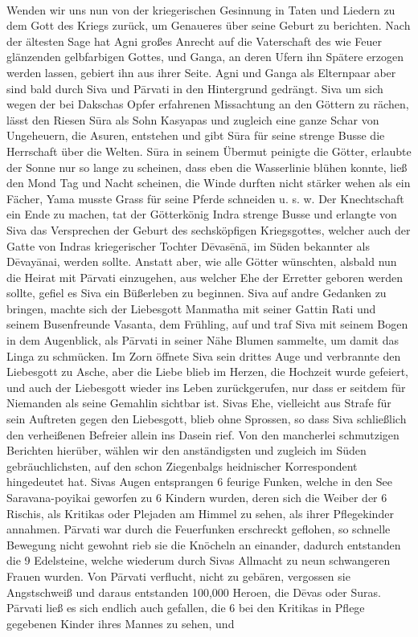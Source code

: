 \documentclass{article}
\begin{document}
\paragraph{}
Wenden wir uns nun von der kriegerischen Gesinnung in Taten und Liedern zu dem Gott des Kriegs zurück, um Genaueres über seine Geburt zu berichten. Nach der ältesten Sage hat Agni großes Anrecht auf die Vaterschaft des wie Feuer glänzenden gelbfarbigen Gottes, und Ganga, an deren Ufern ihn Spätere erzogen werden lassen, gebiert ihn aus ihrer Seite. Agni und Ganga als Elternpaar aber sind bald durch Siva und P\={a}rvati in den Hintergrund gedrängt. Siva um sich wegen der bei Dakschas Opfer erfahrenen Missachtung an den Göttern zu rächen, lässt den Riesen S\={u}ra als Sohn Kasyapas und zugleich eine ganze Schar von Ungeheuern, die Asuren, entstehen und gibt S\={u}ra für seine strenge Busse die Herrschaft über die Welten. S\={u}ra in seinem Übermut peinigte die Götter, erlaubte der Sonne nur so lange zu scheinen, dass eben die Wasserlinie blühen konnte, ließ den Mond Tag und Nacht scheinen, die Winde durften nicht stärker wehen als ein Fächer, Yama musste Grass für seine Pferde schneiden u. s. w. Der Knechtschaft ein Ende zu machen, tat der Götterkönig Indra strenge Busse und erlangte von Siva das Versprechen der Geburt des sechsköpfigen Kriegsgottes, welcher auch der Gatte von Indras kriegerischer Tochter D\={e}vas\={e}n\={a}, im Süden bekannter als D\={e}vay\={a}nai, werden sollte. Anstatt aber, wie alle Götter wünschten, alsbald nun die Heirat mit P\={a}rvati einzugehen, aus welcher Ehe der Erretter geboren werden sollte, gefiel es Siva ein Büßerleben zu beginnen. Siva auf andre Gedanken zu bringen, machte sich der Liebesgott Manmatha mit seiner Gattin Rati und seinem Busenfreunde Vasanta, dem Frühling, auf und traf Siva mit seinem Bogen in dem Augenblick, als P\={a}rvati in seiner Nähe Blumen sammelte, um damit das Linga zu schmücken. Im Zorn öffnete Siva sein drittes Auge und verbrannte den Liebesgott zu Asche, aber die Liebe blieb im Herzen, die Hochzeit wurde gefeiert, und auch der Liebesgott wieder ins Leben zurückgerufen, nur dass er seitdem für Niemanden als seine Gemahlin sichtbar ist. Sivas Ehe, vielleicht aus Strafe für sein Auftreten gegen den Liebesgott, blieb ohne Sprossen, so dass Siva schließlich den verheißenen Befreier allein ins Dasein rief. Von den mancherlei schmutzigen Berichten hierüber, wählen wir den anständigsten und zugleich im Süden gebräuchlichsten, auf den schon Ziegenbalgs heidnischer Korrespondent hingedeutet hat. Sivas Augen entsprangen 6 feurige Funken, welche in den See Saravana-poyikai geworfen zu 6 Kindern wurden, deren sich die Weiber der 6 Rischis, als Kritikas oder Plejaden am Himmel zu sehen, als ihrer Pflegekinder annahmen. P\={a}rvati war durch die Feuerfunken erschreckt geflohen, so schnelle Bewegung nicht gewohnt rieb sie die Knöcheln an einander, dadurch entstanden die 9 Edelsteine, welche wiederum durch Sivas Allmacht zu neun schwangeren Frauen wurden. Von P\={a}rvati verflucht, nicht zu gebären, vergossen sie Angstschweiß und daraus entstanden 100,000 Heroen, die D\={e}vas oder Suras. P\={a}rvati ließ es sich endlich auch gefallen, die 6 bei den Kritikas in Pflege gegebenen Kinder ihres Mannes zu sehen, und 
\end{document}
